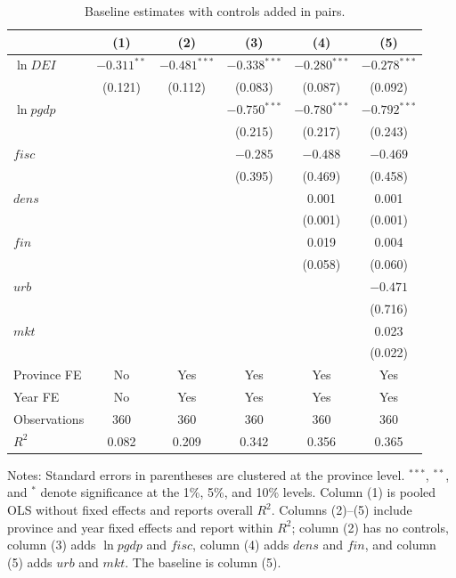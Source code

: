 \documentclass[economies,article,submit,moreauthors]{Definitions/mdpi}
\begin{document}
\begin{table}[!htbp]
\centering
\caption{Baseline estimates with controls added in pairs.}
\label{tab:baseline}
\footnotesize
\setlength{\tabcolsep}{6pt}
\begin{threeparttable}
\begin{tabular}{lccccc}
\toprule
 & (1) & (2) & (3) & (4) & (5)\\
\midrule
$\ln DEI$ & $-0.311^{**}$ & $-0.481^{***}$ & $-0.338^{***}$ & $-0.280^{***}$ & $-0.278^{***}$\\
 & (0.121) & (0.112) & (0.083) & (0.087) & (0.092)\\
$\ln pgdp$ & & & $-0.750^{***}$ & $-0.780^{***}$ & $-0.792^{***}$\\
 & & & (0.215) & (0.217) & (0.243)\\
$fisc$ & & & $-0.285$ & $-0.488$ & $-0.469$\\
 & & & (0.395) & (0.469) & (0.458)\\
$dens$ & & & & 0.001 & 0.001\\
 & & & & (0.001) & (0.001)\\
$fin$ & & & & 0.019 & 0.004\\
 & & & & (0.058) & (0.060)\\
$urb$ & & & & & $-0.471$\\
 & & & & & (0.716)\\
$mkt$ & & & & & 0.023\\
 & & & & & (0.022)\\
\midrule
Province FE & No & Yes & Yes & Yes & Yes\\
Year FE & No & Yes & Yes & Yes & Yes\\
Observations & 360 & 360 & 360 & 360 & 360\\
$R^2$ & 0.082 & 0.209 & 0.342 & 0.356 & 0.365\\
\bottomrule
\end{tabular}
\begin{tablenotes}\footnotesize
\item Notes: Standard errors in parentheses are clustered at the province level. $^{***}$, $^{**}$, and $^{*}$ denote significance at the 1\%, 5\%, and 10\% levels. Column (1) is pooled OLS without fixed effects and reports overall $R^2$. Columns (2)--(5) include province and year fixed effects and report within $R^2$; column (2) has no controls, column (3) adds $\ln pgdp$ and $fisc$, column (4) adds $dens$ and $fin$, and column (5) adds $urb$ and $mkt$. The baseline is column (5).
\end{tablenotes}
\end{threeparttable}
\end{table}
\end{document}
